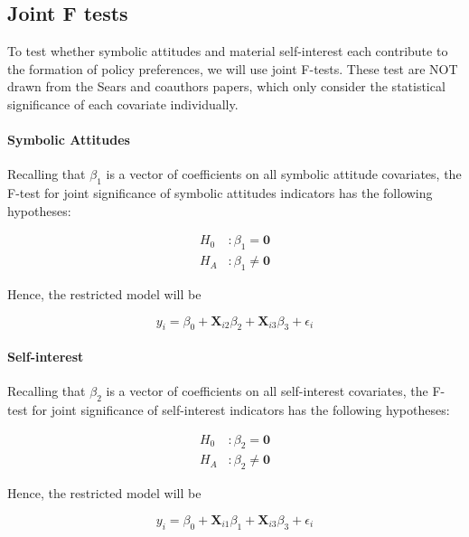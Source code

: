 \documentclass[]{article}
\let\oldparagraph\paragraph
\renewcommand{\paragraph}[1]{\oldparagraph{#1}\mbox{}}
\begin{document}
\subsection{Joint F tests}\label{joint-f-tests}

To test whether symbolic attitudes and material self-interest each
contribute to the formation of policy preferences, we will use joint
F-tests. These test are NOT drawn from the Sears and coauthors papers,
which only consider the statistical significance of each covariate
individually.

\paragraph{Symbolic Attitudes}\label{symbolic-attitudes}

Recalling that \(\beta_1\) is a vector of coefficients on all symbolic
attitude covariates, the F-test for joint significance of symbolic
attitudes indicators has the following hypotheses:

\[\begin{aligned}
H_0 \  &: \beta_1 = \textbf{0}\\ H_A&: \beta_1 \neq \textbf{0}
\end{aligned}\]

Hence, the restricted model will be

\begin{equation}
y_i = \beta_0 + \textbf{X}_{i2}\beta_2 +  \textbf{X}_{i3}\beta_3 + \epsilon_i
\end{equation}

\paragraph{Self-interest}\label{self-interest}

Recalling that \(\beta_2\) is a vector of coefficients on all
self-interest covariates, the F-test for joint significance of
self-interest indicators has the following hypotheses:

\[\begin{aligned}
H_0\ &: \beta_2 = \textbf{0}\\ H_A &: \beta_2 \neq \textbf{0}
\end{aligned}\]

Hence, the restricted model will be

\begin{equation}
y_i = \beta_0 + \textbf{X}_{i1}\beta_1 +  \textbf{X}_{i3}\beta_3 + \epsilon_i
\end{equation}
\end{document}
